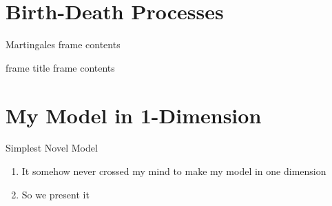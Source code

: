 \documentclass[aspectratio=169,  notheorems, sOuRcEs]{RUCPresentation}
\newcounter{reaction}
\begin{document}
%
%
%
%
%
%
%
%

\section{Birth-Death Processes}
\begin{frame}{Martingales}
    frame contents
\end{frame}

\begin{frame}{frame title}
    frame contents
\end{frame}


\section{My Model in 1-Dimension}
\begin{frame}{Simplest Novel Model}

    \begin{enumerate}
        \item It somehow never crossed my mind to make my model in one dimension
        \item So we present it
    \end{enumerate}

    \begin{reactiontable}
    \end{reactiontable}


\end{frame}
\end{document}
